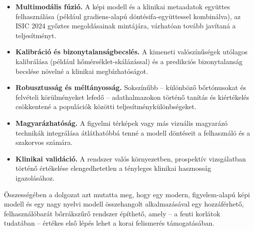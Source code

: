 \begin{itemize}
  \item \textbf{Multimodális fúzió.} A képi modell és a klinikai metaadatok
  együttes felhasználása (például gradiens-alapú döntésifa-együttessel
  kombinálva), az ISIC 2024 győztes megoldásainak mintájára, várhatóan tovább
  javítaná a teljesítményt.
  \item \textbf{Kalibráció és bizonytalanságbecslés.} A kimeneti valószínűségek
  utólagos kalibrálása (például hőmérséklet-skálázással) és a predikciós
  bizonytalanság becslése növelné a klinikai megbízhatóságot.
  \item \textbf{Robusztusság és méltányosság.} Sokszínűbb -- különböző
  bőrtónusokat és felvételi körülményeket lefedő -- adathalmazokon történő
  tanítás és kiértékelés csökkentené a populációk közötti
  teljesítménykülönbségeket.
  \item \textbf{Magyarázhatóság.} A figyelmi térképek vagy más vizuális
  magyarázó technikák integrálása átláthatóbbá tenné a modell döntéseit a
  felhasználó és a szakorvos számára.
  \item \textbf{Klinikai validáció.} A rendszer valós környezetben, prospektív
  vizsgálatban történő értékelése elengedhetetlen a tényleges klinikai
  hasznosság igazolásához.
\end{itemize}

Összességében a dolgozat azt mutatta meg, hogy egy modern, figyelem-alapú képi
modell és egy nagy nyelvi modell összehangolt alkalmazásával egy hozzáférhető,
felhasználóbarát bőrrákszűrő rendszer építhető, amely -- a fenti korlátok
tudatában -- értékes első lépés lehet a korai felismerés támogatásában.
